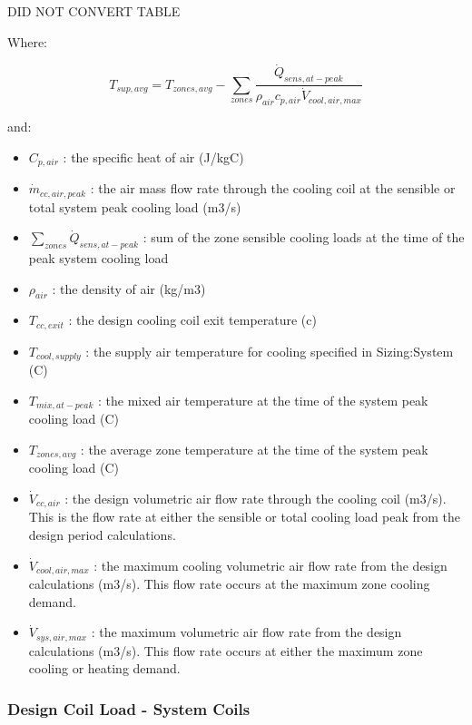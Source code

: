 DID NOT CONVERT TABLE

Where:

\begin{equation}
T_{sup,avg} = T_{zones,avg}-\sum_{zones}\frac{\dot{Q}_{sens,at-peak}}{\rho_{air}c_{p,air}\dot{V}_{cool,air,max}}
\end{equation}

and:

\begin{itemize}
\item
  \(C_{p,air}\) : the specific heat of air (J/kgC)
\item
  \(\dot{m}_{cc,air,peak}\) : the air mass flow rate through the cooling coil at the sensible or total system peak cooling load (m3/s)
\item
  \(\sum_{zones}\dot{Q}_{sens,at-peak}\) : sum of the zone sensible cooling loads at the time of the peak system cooling load
\item
  \(\rho_{air}\) : the density of air (kg/m3)
\item
  \(T_{cc,exit}\) : the design cooling coil exit temperature (c)
\item
  \(T_{cool,supply}\) : the supply air temperature for cooling specified in Sizing:System (C)
\item
  \(T_{mix,at-peak}\) : the mixed air temperature at the time of the system peak cooling load (C)
\item
  \(T_{zones,avg}\) : the average zone temperature at the time of the system peak cooling load (C)
\item
  \(\dot{V}_{cc,air}\) : the design volumetric air flow rate through the cooling coil (m3/s). This is the flow rate at either the sensible or total cooling load peak from the design period calculations.
\item
  \(\dot{V}_{cool,air,max}\) : the maximum cooling volumetric air flow rate from the design calculations (m3/s). This flow rate occurs at the maximum zone cooling demand.
\item
  \(\dot{V}_{sys,air,max}\) : the maximum volumetric air flow rate from the design calculations (m3/s). This flow rate occurs at either the maximum zone cooling or heating demand.
\end{itemize}

\subsubsection{Design Coil Load - System Coils}\label{design-coil-load---system-coils}

